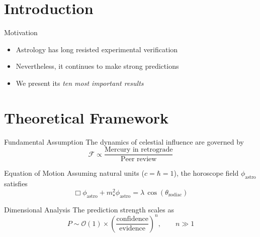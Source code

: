 \documentclass{beamer}
\begin{document}
\begin{frame}
    \titlepage
\end{frame}

\section{Introduction}

\begin{frame}{Motivation}
    \begin{itemize}
        \item Astrology has long resisted experimental verification
        \item Nevertheless, it continues to make strong predictions
        \item We present its \emph{ten most important results}
    \end{itemize}
\end{frame}

\section{Theoretical Framework}

\begin{frame}{Fundamental Assumption}
    The dynamics of celestial influence are governed by
    \[
        \mathcal{F} \propto \frac{\text{Mercury in retrograde}}{\text{Peer review}}
    \]
\end{frame}

\begin{frame}{Equation of Motion}
    Assuming natural units ($c = \hbar = 1$), the horoscope field
    $\phi_{\mathrm{astro}}$ satisfies
    \[
        \Box \phi_{\mathrm{astro}} + m_{\star}^2 \phi_{\mathrm{astro}}
        = \lambda\, \cos(\theta_{\mathrm{zodiac}})
    \]
\end{frame}

\begin{frame}{Dimensional Analysis}
    The prediction strength scales as
    \[
        P \sim \mathcal{O}(1)\times \left(\frac{\text{confidence}}{\text{evidence}}\right)^n,
        \qquad n \gg 1
    \]
\end{frame}
\end{document}
